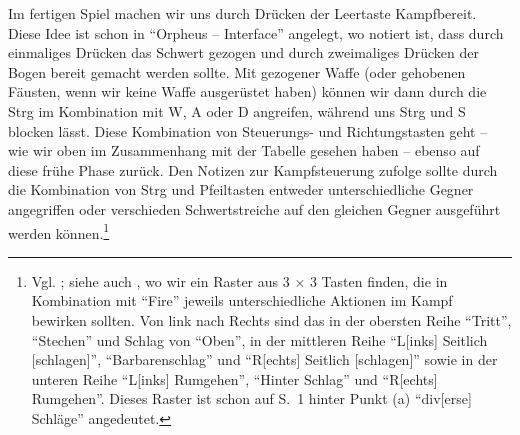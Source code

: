 \documentclass[a5paper,pagesize,numbers=noenddot]{scrbook}
\begin{document}
Im fertigen Spiel machen wir uns durch Drücken der Leertaste Kampfbereit.
Diese Idee ist schon in \enquote{Orpheus -- Interface} angelegt, wo notiert ist, dass durch einmaliges Drücken das Schwert gezogen und durch zweimaliges Drücken der Bogen bereit gemacht werden sollte.\autocite[S.~2]{orpheus_interface}
Mit gezogener Waffe (oder gehobenen Fäusten, wenn wir keine Waffe ausgerüstet haben) können wir dann durch die Strg im Kombination mit W, A oder D angreifen, während uns Strg und S blocken lässt.
Diese Kombination von Steuerungs- und Richtungstasten geht -- wie wir oben im Zusammenhang mit der Tabelle gesehen haben -- ebenso auf diese frühe Phase zurück.
Den Notizen zur Kampfsteuerung zufolge sollte durch die Kombination von Strg und Pfeiltasten entweder unterschiedliche Gegner angegriffen oder verschieden Schwertstreiche auf den gleichen Gegner ausgeführt werden können.\footnote{Vgl. \autocite[S.~1--3]{orpheus_kampfsteuerung}; siehe auch \autocite[S.~4]{orpheus_interface}, wo wir ein Raster aus 3 × 3 Tasten finden, die in Kombination mit \enquote{Fire} jeweils unterschiedliche Aktionen im Kampf bewirken sollten. Von link nach Rechts sind das in der obersten Reihe \enquote{Tritt}, \enquote{Stechen} und Schlag von \enquote{Oben}, in der mittleren Reihe \enquote{L[inks] Seitlich [schlagen]}, \enquote{Barbarenschlag} und \enquote{R[echts] Seitlich [schlagen]} sowie in der unteren Reihe \enquote{L[inks] Rumgehen}, \enquote{Hinter Schlag} und \enquote{R[echts] Rumgehen}. Dieses Raster ist schon auf S.~1 hinter Punkt (a) \enquote{div[erse] Schläge} angedeutet.}
\end{document}
